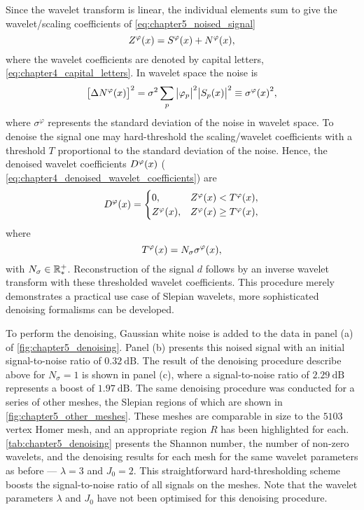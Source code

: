 Since the wavelet transform is linear, the individual elements sum to give the wavelet/scaling coefficients of \cref{eq:chapter5_noised_signal}
%
\begin{equation}
	Z^{\varphi}(x)
	= S^{\varphi}(x) + N^{\varphi}(x),
\end{equation}
%
where the wavelet coefficients are denoted by capital letters, \ie{} \cref{eq:chapter4_capital_letters}.
In wavelet space the noise is
%
\begin{equation}
	{\big[\Delta N^{\varphi}(x)\big]}^{2}
	= \sigma^{2} \displaystyle\sum\limits_{p} \big\lvert{\varphi}_{p}\big\rvert^{2} \big\lvert{S}_{p}(x)\big\rvert^{2}
	\equiv {\sigma^{\varphi}(x)}^{2},
\end{equation}
%
where \(\sigma^{\varphi}\) represents the standard deviation of the noise in wavelet space.
To denoise the signal one may hard-threshold the scaling/wavelet coefficients with a threshold \(T\) proportional to the standard deviation of the noise.
Hence, the denoised wavelet coefficients \(D^{\varphi}(x)\) (\eg{} \cref{eq:chapter4_denoised_wavelet_coefficients}) are
%
\begin{equation}
	D^{\varphi}(x) =
	\begin{cases}
		0,
		 & Z^{\varphi}(x) < T^{\varphi}(x),    \\
		Z^{\varphi}(x),
		 & Z^{\varphi}(x) \geq T^{\varphi}(x),
	\end{cases}
\end{equation}
%
where
%
\begin{equation}
	T^{\varphi}(x)
	= N_{\sigma}\sigma^{\varphi}(x),
\end{equation}
%
with \(N_{\sigma} \in \mathbb{R}_{\ast}^{+}{}\).
Reconstruction of the signal \(d\) follows by an inverse wavelet transform with these thresholded wavelet coefficients.
This procedure merely demonstrates a practical use case of Slepian wavelets, more sophisticated denoising formalisms can be developed.

To perform the denoising, Gaussian white noise is added to the data in panel (a) of \cref{fig:chapter5_denoising}.
Panel (b) presents this noised signal with an initial signal-to-noise ratio of \(\SI{0.32}{\dB}\).
The result of the denoising procedure describe above for \(N_{\sigma}=1\) is shown in panel (c), where a signal-to-noise ratio of \(\SI{2.29}{\dB}\) represents a boost of \(\SI{1.97}{\dB}\).
The same denoising procedure was conducted for a series of other meshes, the Slepian regions of which are shown in \cref{fig:chapter5_other_meshes}.
These meshes are comparable in size to the \(\num{5103}\) vertex Homer mesh, and an appropriate region \(R\) has been highlighted for each.
\cref{tab:chapter5_denoising} presents the Shannon number, the number of non-zero wavelets, and the denoising results for each mesh for the same wavelet parameters as before --- \(\lambda=3\) and \(J_{0}=2\).
This straightforward hard-thresholding scheme boosts the signal-to-noise ratio of all signals on the meshes.
Note that the wavelet parameters \(\lambda{}\) and \(J_{0}\) have not been optimised for this denoising procedure.

